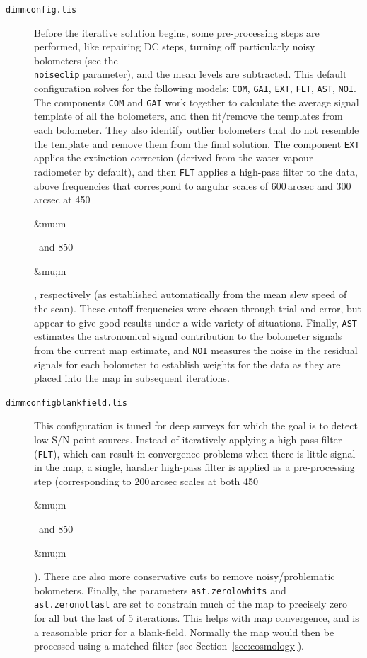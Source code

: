 \documentclass[twoside,11pt]{article}
\newcommand{\micron}{\mbox{\,${\umu}$m}}            %
\renewcommand{\_}{\texttt{\symbol{95}}}
\renewcommand{\micron}{\begin{rawhtml}&mu;m\end{rawhtml}}
\begin{document}
\begin{description}

\item[\texttt{dimmconfig.lis}]\quad Before the iterative solution
  begins, some pre-processing steps are performed, like repairing DC
  steps, turning off particularly noisy bolometers (see the
  \\ \texttt{noiseclip} parameter), and the mean levels are
  subtracted.  This default configuration solves for the following
  models: \texttt{COM}, \texttt{GAI}, \texttt{EXT}, \texttt{FLT},
  \texttt{AST}, \texttt{NOI}. The components \texttt{COM} and
  \texttt{GAI} work together to calculate the average signal template
  of all the bolometers, and then fit/remove the templates from each
  bolometer. They also identify outlier bolometers that do not
  resemble the template and remove them from the final solution. The
  component \texttt{EXT} applies the extinction correction (derived
  from the water vapour radiometer by default), and then \texttt{FLT}
  applies a high-pass filter to the data, above frequencies that
  correspond to angular scales of 600\,arcsec and 300\,arcsec at
  450\micron\ and 850\micron, respectively (as established
  automatically from the mean slew speed of the scan). These cutoff
  frequencies were chosen through trial and error, but appear to give
  good results under a wide variety of situations. Finally,
  \texttt{AST} estimates the astronomical signal contribution to the
  bolometer signals from the current map estimate, and \texttt{NOI}
  measures the noise in the residual signals for each bolometer to
  establish weights for the data as they are placed into the map in
  subsequent iterations.

\item[\texttt{dimmconfig\_blank\_field.lis}]\quad This configuration
  is tuned for deep surveys for which the goal is to detect low-S/N
  point sources. Instead of iteratively applying a high-pass filter
  (\texttt{FLT}), which can result in convergence problems when there
  is little signal in the map, a single, harsher high-pass filter is
  applied as a pre-processing step (corresponding to 200\,arcsec
  scales at both 450\micron\ and 850\micron). There are also more
  conservative cuts to remove noisy/problematic bolometers. Finally,
  the parameters \texttt{ast.zero\_lowhits} and
  \texttt{ast.zero\_notlast} are set to constrain much of the map to
  precisely zero for all but the last of 5 iterations. This helps with
  map convergence, and is a reasonable prior for a
  blank-field. Normally the map would then be processed using a
  matched filter (see Section~\ref{sec:cosmology}).


\end{description}
\end{document}
